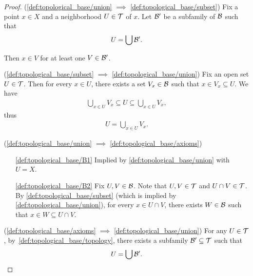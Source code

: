 \begin{proof}
  (\ref{def:topological_base/union} $\implies$ \ref{def:topological_base/subset}) Fix a point $x \in X$ and a neighborhood $U \in \mathcal T$ of $x$. Let $\mathcal B'$ be a subfamily of $\mathcal B$ such that
  \begin{align*}
    U = \bigcup \mathcal B'.
  \end{align*}

  Then $x \in V$ for at least one $V \in \mathcal B'$.

  (\ref{def:topological_base/subset} $\implies$ \ref{def:topological_base/union}) Fix an open set $U \in \mathcal T$. Then for every $x \in U$, there exists a set $V_x \in \mathcal B$ such that $x \in V_x \subseteq U$. We have
  \begin{align*}
    \bigcup_{x \in U} V_x \subseteq U \subseteq \bigcup_{x \in U} V_x,
  \end{align*}
  thus
  \begin{align*}
    U = \bigcup_{x \in U} V_x.
  \end{align*}

  (\ref{def:topological_base/union} $\implies$ \ref{def:topological_base/axioms})
  \begin{enumerate}
    \item[\ref{def:topological_base/B1}] Implied by \cref{def:topological_base/union} with $U = X$.
    \item[\ref{def:topological_base/B2}] Fix $U, V \in \mathcal B$. Note that $U, V \in \mathcal T$ and $U \cap V \in \mathcal T$. By \cref{def:topological_base/subset} (which is implied by \cref{def:topological_base/union}), for every $x \in U \cap V$, there exists $W \in \mathcal B$ such that $x \in W \subseteq U \cap V$.
  \end{enumerate}

  (\ref{def:topological_base/axioms} $\implies$ \ref{def:topological_base/union}) For any $U \in \mathcal T$, by~\cref{def:topological_base/topology}, there exists a subfamily $\mathcal B' \subseteq \mathcal T$ such that
  \begin{align*}
    U = \bigcup \mathcal B'.
  \end{align*}
\end{proof}

